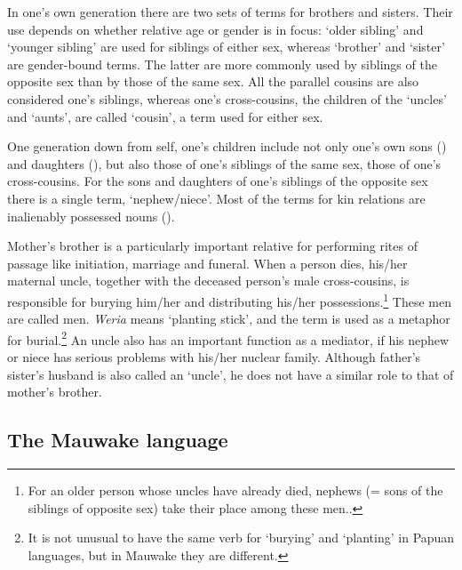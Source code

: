 In one's own generation there are two sets of terms for brothers and sisters. Their use  depends on whether relative age or gender is in focus:  `older sibling' and  `younger sibling' are used for siblings of either sex, whereas  `brother'  and  `sister' are gender-bound terms. The latter are more commonly used by siblings of the opposite sex than by those of the same sex. All the parallel cousins are also considered one's siblings, whereas one's cross-cousins, the children of the `uncles' and `aunts', are called  `cousin', a term used for either sex.

One generation down from self, one's children include not only one's own sons () and daughters (), but also those of one's siblings of the same sex,  those of one's cross-cousins. For the sons and daughters of one's siblings of the opposite sex there is a single term,  `nephew/niece'. Most of the terms for kin relations are inalienably possessed nouns (). 

Mother's brother is a particularly important relative for performing rites of passage like initiation, marriage and funeral. When a person dies, his/her maternal uncle, together with the deceased person's male cross-cousins, is responsible for burying him/her and distributing his/her possessions.\footnote{For an older person whose uncles have already died, nephews (= sons of the siblings of opposite sex) take their place among these men..} These men are called  men.  \textit{Weria} means `planting stick', and the term is used as a metaphor for burial.\footnote{It is not unusual to have the same verb for `burying' and `planting' in Papuan languages, but in Mauwake they are different.} An uncle also has an important function as a mediator, if his nephew or niece has serious problems with his/her nuclear family. Although father's sister's husband is also called an `uncle', he does not have a similar role to that of mother's brother.  

\subsection{The Mauwake language}
